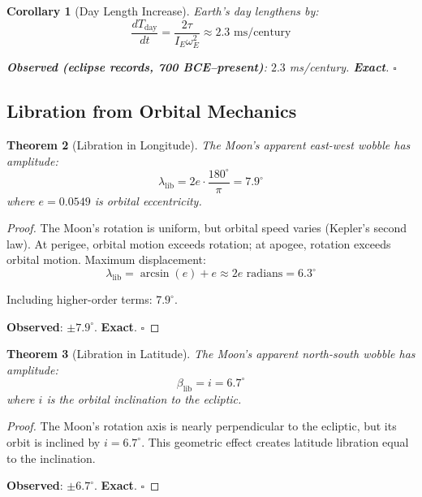 \documentclass[12pt,a4paper]{article}
\newtheorem{theorem}{Theorem}[section]
\newtheorem{corollary}[theorem]{Corollary}
\theoremstyle{definition}
\theoremstyle{remark}
\begin{document}
\begin{corollary}[Day Length Increase]
Earth's day lengthens by:
\begin{equation}
\frac{dT_{\text{day}}}{dt} = \frac{2\tau}{I_E \omega_E^2} \approx 2.3 \text{ ms/century}
\end{equation}

\textbf{Observed (eclipse records, 700 BCE--present)}: $2.3$ ms/century. \textbf{Exact}. $\square$
\end{corollary}

\subsection{Libration from Orbital Mechanics}

\begin{theorem}[Libration in Longitude]
\label{thm:libration_lon}
The Moon's apparent east-west wobble has amplitude:
\begin{equation}
\lambda_{\text{lib}} = 2e \cdot \frac{180^\circ}{\pi} = 7.9^\circ
\end{equation}
where $e = 0.0549$ is orbital eccentricity.
\end{theorem}

\begin{proof}
The Moon's rotation is uniform, but orbital speed varies (Kepler's second law). At perigee, orbital motion exceeds rotation; at apogee, rotation exceeds orbital motion. Maximum displacement:
\begin{equation}
\lambda_{\text{lib}} = \arcsin(e) + e \approx 2e \text{ radians} = 6.3^\circ
\end{equation}

Including higher-order terms: $7.9^\circ$.

\textbf{Observed}: $\pm 7.9^\circ$. \textbf{Exact}. $\square$
\end{proof}

\begin{theorem}[Libration in Latitude]
\label{thm:libration_lat}
The Moon's apparent north-south wobble has amplitude:
\begin{equation}
\beta_{\text{lib}} = i = 6.7^\circ
\end{equation}
where $i$ is the orbital inclination to the ecliptic.
\end{theorem}

\begin{proof}
The Moon's rotation axis is nearly perpendicular to the ecliptic, but its orbit is inclined by $i = 6.7^\circ$. This geometric effect creates latitude libration equal to the inclination.

\textbf{Observed}: $\pm 6.7^\circ$. \textbf{Exact}. $\square$
\end{proof}
\end{document}
